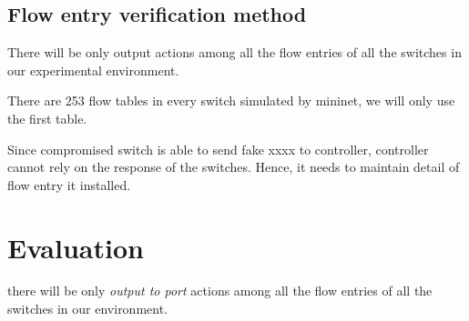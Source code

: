 \subsection{Flow entry verification method}
There will be only output actions among all the flow entries of all the switches in our experimental environment.


There are 253 flow tables in every switch simulated by mininet, we will only use the first table.

Since compromised switch is able to send fake xxxx to controller, controller cannot rely on the response of the switches. Hence, it needs to maintain detail of flow entry it installed. 

\section{Evaluation}


there will be only \textit{output to port} actions among all the flow entries of all the switches in our environment. 